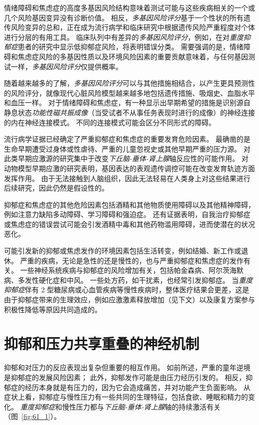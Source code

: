情绪障碍和焦虑症的高度多基因风险结构意味着测试可能与这些疾病相关的一个或几个风险基因变异没有诊断价值。
相反，\textit{多基因风险评分}基于一个性状的所有遗传风险变异的总和，正在成为流行病学和临床研究中根据遗传风险严重程度对个体进行分层的有用工具。
临床队列中有差异的\textit{多基因风险评分}，例如，在对\textit{重度抑郁症}患者的研究中显示低抑郁症风险，将表明错误分类。
需要强调的是，情绪障碍和焦虑症风险的多基因性质以及环境风险因素的重要贡献意味着，与任何基因测试一样，\textit{多基因风险评分}仅提供概率。


随着越来越多的了解，\textit{多基因风险评分}可以与其他措施相结合，以产生更具预测性的风险评分，就像现代心脏风险模型越来越多地包括遗传措施、吸烟史、血脂水平和血压一样。
对于情绪障碍和焦虑症，有一种显示出早期希望的措施是识别源自静息状态\textit{功能性磁共振成像}（当受试者不从事任务表现时进行的成像）的神经连接的内在神经连接模式。
不同的连接模式可能会区分不同形式的障碍。


流行病学证据已经确定了严重抑郁症和焦虑症的重要发育危险因素。
最确凿的是生命早期遭受过身体或性虐待、严重的儿童忽视史或其他早期严重的压力源。
对此类早期应激源的研究集中于改变\textit{下丘脑-垂体-肾上腺}轴反应性的可能作用。
对动物模型早期应激的研究表明，基因表达的表观遗传调控可能在改变发育轨迹方面发挥作用。
由于无法接触到人脑组织，因此无法轻易在人类身上对这些结果进行后续研究，因此仍然是假设性的。


抑郁症和焦虑症的其他危险因素包括酒精和其他物质使用障碍以及其他精神障碍，例如注意力缺陷多动障碍、学习障碍和强迫症。
还有证据表明，自我治疗抑郁症或焦虑症的错误尝试可能会引发酒精中毒和其他药物滥用障碍，进而使潜在的状况恶化。


可能引发新的抑郁或焦虑发作的环境因素包括生活转变，例如结婚、新工作或退休。
严重的疾病，无论是急性的还是慢性的，也与严重抑郁症和焦虑症的发作有关。
一些神经系统疾病与抑郁症的风险增加有关，包括帕金森病、阿尔茨海默病、多发性硬化症和中风。
一些处方药，如干扰素，也经常引发抑郁症。
当\textit{重度抑郁症}伴有 2 型糖尿病或心血管疾病等慢性疾病时，整体医疗结果会更差，这是由于抑郁症带来的生理效应，例如应激激素释放增加（见下文）以及康复方案参与积极性降低等原因共同造成的。



\section{抑郁和压力共享重叠的神经机制}

抑郁和对压力的反应表现出复杂但重要的相互作用。
如前所述，严重的童年逆境是抑郁症的发展风险因素；
此外，抑郁发作可能是由压力经历引发的。
相反，抑郁症的经历本身就是有压力的，因为它会造成痛苦，并对功能产生负面影响。
从症状上看，抑郁症与慢性压力有一些共同的生理特征，包括食欲、睡眠和精力的变化。
\textit{重度抑郁症}和慢性压力都与\textit{下丘脑-垂体-肾上腺}轴的持续激活有关（图~\ref{fig:61_1}）。


